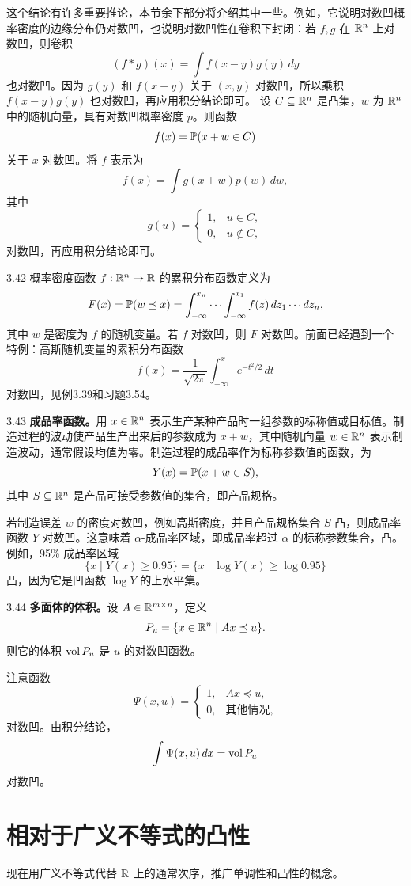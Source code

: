 这个结论有许多重要推论，本节余下部分将介绍其中一些。例如，它说明对数凹概率密度的边缘分布仍对数凹，也说明对数凹性在卷积下封闭：若 $f,g$ 在 $\mathbb R^n$ 上对数凹，则卷积
\[(f*g)(x)=\int f(x-y)g(y)\,dy\]
也对数凹。因为 $g(y)$ 和 $f(x-y)$ 关于 $(x,y)$ 对数凹，所以乘积 $f(x-y)g(y)$ 也对数凹，再应用积分结论即可。
设 $C\subseteq\mathbb R^n$ 是凸集，$w$ 为 $\mathbb R^n$ 中的随机向量，具有对数凹概率密度 $p$。则函数
\[f(x)=\mathbb P(x+w\in C)\]
关于 $x$ 对数凹。将 $f$ 表示为
\[f(x)=\int g(x+w)p(w)\,dw,\]
其中
\[g(u)=\begin{cases}1,&u\in C,\\0,&u\notin C,\end{cases}\]
对数凹，再应用积分结论即可。
\begin{origexample}{3.42}
概率密度函数 $f:\mathbb R^n\to\mathbb R$ 的累积分布函数定义为
\[F(x)=\mathbb P(w\preceq x)=\int_{-\infty}^{x_n}\cdots\int_{-\infty}^{x_1}
 f(z)\,dz_1\cdots dz_n,\]
其中 $w$ 是密度为 $f$ 的随机变量。若 $f$ 对数凹，则 $F$ 对数凹。前面已经遇到一个特例：高斯随机变量的累积分布函数
\[f(x)=\frac1{\sqrt{2\pi}}\int_{-\infty}^x e^{-t^2/2}\,dt\]
对数凹，见例3.39和习题3.54。
\end{origexample}
\begin{origexample}{3.43}
\textbf{成品率函数。}用 $x\in\mathbb R^n$ 表示生产某种产品时一组参数的标称值或目标值。制造过程的波动使产品生产出来后的参数成为 $x+w$，其中随机向量 $w\in\mathbb R^n$ 表示制造波动，通常假设均值为零。制造过程的成品率作为标称参数值的函数，为
\[Y(x)=\mathbb P(x+w\in S),\]
其中 $S\subseteq\mathbb R^n$ 是产品可接受参数值的集合，即产品规格。

若制造误差 $w$ 的密度对数凹，例如高斯密度，并且产品规格集合 $S$ 凸，则成品率函数 $Y$ 对数凹。这意味着 $\alpha$-成品率区域，即成品率超过 $\alpha$ 的标称参数集合，凸。例如，95\% 成品率区域
\[\{x\mid Y(x)\geq0.95\}=\{x\mid\log Y(x)\geq\log0.95\}\]
凸，因为它是凹函数 $\log Y$ 的上水平集。
\end{origexample}
\begin{origexample}{3.44}
\textbf{多面体的体积。}设 $A\in\mathbb R^{m\times n}$，定义
\[P_u=\{x\in\mathbb R^n\mid Ax\preceq u\}.\]
则它的体积 $\operatorname{vol} P_u$ 是 $u$ 的对数凹函数。

注意函数
\[\Psi(x,u)=\begin{cases}1,&Ax\preceq u,\\0,&\text{其他情况},\end{cases}\]
对数凹。由积分结论，
\[\int\Psi(x,u)\,dx=\operatorname{vol} P_u\]
对数凹。
\end{origexample}
\section{相对于广义不等式的凸性}
现在用广义不等式代替 $\mathbb R$ 上的通常次序，推广单调性和凸性的概念。
